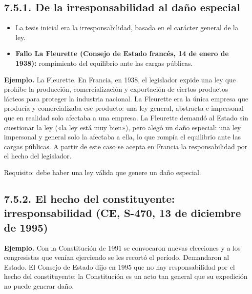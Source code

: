 \subsection{7.5.1. De la irresponsabilidad al daño especial}
\begin{itemize}
\item La tesis inicial era la irresponsabilidad, basada en el carácter general de la ley.
\item \textbf{Fallo La Fleurette (Consejo de Estado francés, 14 de enero de 1938):} rompimiento del equilibrio ante las cargas públicas.
\end{itemize}
\begin{ejemplo}
\textcolor[HTML]{4F6228}{\textbf{Ejemplo. }}La Fleurette. En Francia, en 1938, el legislador expide una ley que prohíbe la producción, comercialización y exportación de ciertos productos lácteos para proteger la industria nacional. La Fleurette era la única empresa que producía y comercializaba ese producto: una ley general, abstracta e impersonal que en realidad solo afectaba a una empresa. La Fleurette demandó al Estado sin cuestionar la ley («la ley está muy bien»), pero alegó un daño especial: una ley impersonal y general solo la afectaba a ella, lo que rompía el equilibrio ante las cargas públicas. A partir de este caso se acepta en Francia la responsabilidad por el hecho del legislador.
\end{ejemplo}
Requisito: debe haber una ley válida que genere un daño especial.

\subsection{7.5.2. El hecho del constituyente: irresponsabilidad (CE, S-470, 13 de diciembre de 1995)}
\begin{ejemplo}
\textcolor[HTML]{4F6228}{\textbf{Ejemplo. }}Con la Constitución de 1991 se convocaron nuevas elecciones y a los congresistas que venían ejerciendo se les recortó el período. Demandaron al Estado. El Consejo de Estado dijo en 1995 que no hay responsabilidad por el hecho del constituyente: la Constitución es un acto tan general que su expedición no puede generar daño.
\end{ejemplo}

